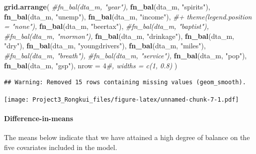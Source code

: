 \documentclass[]{article}
\newenvironment{Shaded}{\begin{snugshade}}{\end{snugshade}}
\newcommand{\CommentTok}[1]{\textcolor[rgb]{0.56,0.35,0.01}{\textit{#1}}}
\newcommand{\DataTypeTok}[1]{\textcolor[rgb]{0.13,0.29,0.53}{#1}}
\newcommand{\DecValTok}[1]{\textcolor[rgb]{0.00,0.00,0.81}{#1}}
\newcommand{\KeywordTok}[1]{\textcolor[rgb]{0.13,0.29,0.53}{\textbf{#1}}}
\newcommand{\NormalTok}[1]{#1}
\newcommand{\OperatorTok}[1]{\textcolor[rgb]{0.81,0.36,0.00}{\textbf{#1}}}
\newcommand{\StringTok}[1]{\textcolor[rgb]{0.31,0.60,0.02}{#1}}
\let\oldparagraph\paragraph
\renewcommand{\paragraph}[1]{\oldparagraph{#1}\mbox{}}
\begin{document}
\begin{Shaded}
\begin{Highlighting}[]
\KeywordTok{grid.arrange}\NormalTok{(}
   \CommentTok{#fn_bal(dta_m, "year"),}
   \KeywordTok{fn_bal}\NormalTok{(dta_m, }\StringTok{"spirits"}\NormalTok{),}
   \KeywordTok{fn_bal}\NormalTok{(dta_m, }\StringTok{"unemp"}\NormalTok{),}
   \KeywordTok{fn_bal}\NormalTok{(dta_m, }\StringTok{"income"}\NormalTok{), }\CommentTok{#+ theme(legend.position = "none"),}
   \KeywordTok{fn_bal}\NormalTok{(dta_m, }\StringTok{"beertax"}\NormalTok{),}
   \CommentTok{#fn_bal(dta_m, "baptist"),}
   \CommentTok{#fn_bal(dta_m, "mormon"),}
   \KeywordTok{fn_bal}\NormalTok{(dta_m, }\StringTok{"drinkage"}\NormalTok{),}
   \KeywordTok{fn_bal}\NormalTok{(dta_m, }\StringTok{"dry"}\NormalTok{),}
   \KeywordTok{fn_bal}\NormalTok{(dta_m, }\StringTok{"youngdrivers"}\NormalTok{),}
   \KeywordTok{fn_bal}\NormalTok{(dta_m, }\StringTok{"miles"}\NormalTok{),}
   \CommentTok{#fn_bal(dta_m, "breath"),}
   \CommentTok{#fn_bal(dta_m, "service"),}
   \KeywordTok{fn_bal}\NormalTok{(dta_m, }\StringTok{"pop"}\NormalTok{),}
   \KeywordTok{fn_bal}\NormalTok{(dta_m, }\StringTok{"gsp"}\NormalTok{),}
   \DataTypeTok{nrow =} \DecValTok{4}\CommentTok{#, widths = c(1, 0.8)}
\NormalTok{)}
\end{Highlighting}
\end{Shaded}

\begin{verbatim}
## Warning: Removed 15 rows containing missing values (geom_smooth).
\end{verbatim}

\texttt{[image: Project3\_Rongkui\_files/figure-latex/unnamed-chunk-7-1.pdf]}

\hypertarget{difference-in-means}{%
\paragraph{Difference-in-means}\label{difference-in-means}}

The means below indicate that we have attained a high degree of balance on the five covariates included in the model.

\begin{Shaded}
\end{Shaded}
\end{document}
